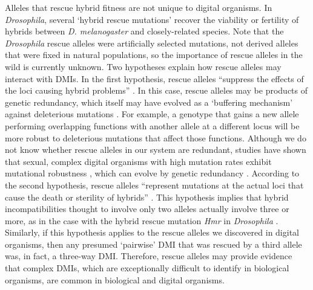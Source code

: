 \begin{doublespace}
Alleles that rescue hybrid fitness are not unique to digital organisms.
%
In \emph{Drosophila}, several `hybrid rescue mutations'
recover the viability or fertility
of hybrids between \emph{D. melanogaster} and closely-related species.
%
Note that the \emph{Drosophila} rescue alleles
were artificially selected mutations,
not derived alleles that were fixed in natural populations,
so the importance of rescue alleles in the wild is currently unknown.
%
Two hypotheses explain how rescue alleles
may interact with DMIs.
%
In the first hypothesis, rescue alleles
``suppress the effects of the loci causing hybrid problems'' \citep{coy04}.
%
In this case, rescue alleles may be products of genetic redundancy,
which itself may have evolved as a `buffering mechanism'
against deleterious mutations \citep{wag99,ele06}.
%
For example, a genotype that gains a new allele performing
overlapping functions with another allele at a different locus
will be more robust to deleterious mutations that affect those functions.
%
Although we do not know whether rescue alleles in our system are redundant,
studies have shown that sexual, complex digital organisms
with high mutation rates exhibit mutational robustness \citep{len99,wil01,mis06},
which can evolve by genetic redundancy \citep{ele07}.
%
According to the second hypothesis, rescue alleles
``represent mutations at the actual loci
that cause the death or sterility of hybrids'' \citep{coy04}.
%
This hypothesis implies that hybrid incompatibilities
thought to involve only two alleles actually involve three or more,
as in the case with the hybrid rescue mutation
\emph{Hmr} in \emph{Drosophila} \citep{bar00,orr00}.
%
Similarly, if this hypothesis applies
to the rescue alleles we discovered in digital organisms,
then any presumed `pairwise' DMI that was rescued by a third allele
was, in fact, a three-way DMI.
%
Therefore, rescue alleles may provide evidence that complex DMIs,
which are exceptionally difficult to identify in biological organisms,
are common in biological and digital organisms.



\end{doublespace}
